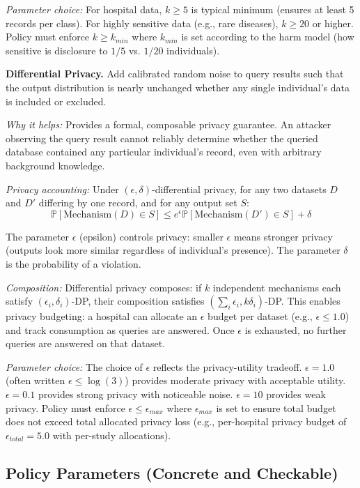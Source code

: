 \emph{Parameter choice:} For hospital data, $k \geq 5$ is typical minimum (ensures at least 5 records per class). For highly sensitive data (e.g., rare diseases), $k \geq 20$ or higher. Policy must enforce $k \geq k_{min}$ where $k_{min}$ is set according to the harm model (how sensitive is disclosure to $1/5$ vs. $1/20$ individuals).

\textbf{Differential Privacy.} Add calibrated random noise to query results such that the output distribution is nearly unchanged whether any single individual's data is included or excluded.

\emph{Why it helps:} Provides a formal, composable privacy guarantee. An attacker observing the query result cannot reliably determine whether the queried database contained any particular individual's record, even with arbitrary background knowledge.

\emph{Privacy accounting:} Under $(\epsilon, \delta)$-differential privacy, for any two datasets $D$ and $D'$ differing by one record, and for any output set $S$:
\[
\mathbb{P}[\text{Mechanism}(D) \in S] \leq e^\epsilon \mathbb{P}[\text{Mechanism}(D') \in S] + \delta
\]

The parameter $\epsilon$ (epsilon) controls privacy: smaller $\epsilon$ means stronger privacy (outputs look more similar regardless of individual's presence). The parameter $\delta$ is the probability of a violation.

\emph{Composition:} Differential privacy composes: if $k$ independent mechanisms each satisfy $(\epsilon_i, \delta_i)$-DP, their composition satisfies $(\sum_i \epsilon_i, k \delta_i)$-DP. This enables privacy budgeting: a hospital can allocate an $\epsilon$ budget per dataset (e.g., $\epsilon \leq 1.0$) and track consumption as queries are answered. Once $\epsilon$ is exhausted, no further queries are answered on that dataset.

\emph{Parameter choice:} The choice of $\epsilon$ reflects the privacy-utility tradeoff. $\epsilon = 1.0$ (often written $\epsilon \leq \log(3)$) provides moderate privacy with acceptable utility. $\epsilon = 0.1$ provides strong privacy with noticeable noise. $\epsilon = 10$ provides weak privacy. Policy must enforce $\epsilon \leq \epsilon_{max}$ where $\epsilon_{max}$ is set to ensure total budget does not exceed total allocated privacy loss (e.g., per-hospital privacy budget of $\epsilon_{total} = 5.0$ with per-study allocations).

\subsection{Policy Parameters (Concrete and Checkable)}

